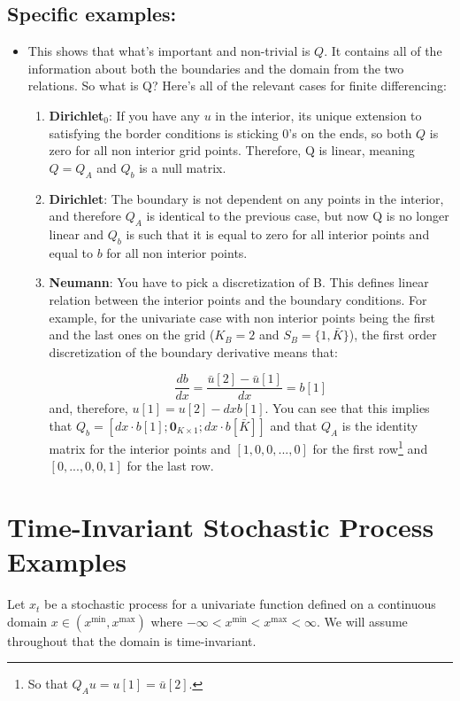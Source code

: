 \documentclass[11pt]{article}
\begin{document}
	\subsection{Specific examples:}
	\begin{itemize}
		\item This shows that what's important and non-trivial is $Q$. It contains all of the information about both the boundaries and the domain from the two relations. So what is Q? Here's all of the relevant cases for finite differencing:
		\begin{enumerate}
			\item \textbf{Dirichlet$_0$}: If you have any $u$ in the interior, its unique extension to satisfying the border conditions is sticking $0$'s on the ends, so both $Q$ is zero for all non interior grid points. Therefore, Q is linear, meaning $Q = Q_A$ and $Q_b$ is a null matrix.

			\item \textbf{Dirichlet}: The boundary is not dependent on any points in the interior, and therefore $Q_A$ is identical to the previous case, but now Q is no longer linear and
	 		$Q_b$ is such that it is equal to zero for all interior points and equal to $b$ for all non interior points.

			\item \textbf{Neumann}: You have to pick a discretization of B. This defines linear relation between the interior points and the boundary conditions. For example, for the univariate case with non interior points being the first and the last ones on the grid ($K_B = 2$ and $S_B = \{1,\bar{K}\}$), the first order discretization of the boundary derivative means that:

			\begin{equation}
				\frac{db}{dx} = \frac{\bar{u}[2] - \bar{u}[1]}{dx} = b[1]
			\end{equation}
			and, therefore, $u[1] = u[2] - dx b[1]$. You can see that this implies that $Q_b = [dx\cdot b[1];\mathbf{0}_{K \times 1};dx\cdot b[\bar{K}]]$ and that $Q_A$ is the identity matrix for the interior points and $[1,0, 0,...,0]$ for the first row\footnote{So that $Q_A u = u[1] = \bar{u}[2]$.} and $[0,...,0,0,1]$ for the last row.%

		\end{enumerate}
	\end{itemize}

\section{Time-Invariant Stochastic Process Examples}\label{sec:examples}
Let $x_t$ be a stochastic process for a univariate function defined on a continuous domain $x \in (x^{\min}, x^{\max})$ where $-\infty < x^{\min} < x^{\max} < \infty$.  We will assume throughout that the domain is time-invariant.
\end{document}
